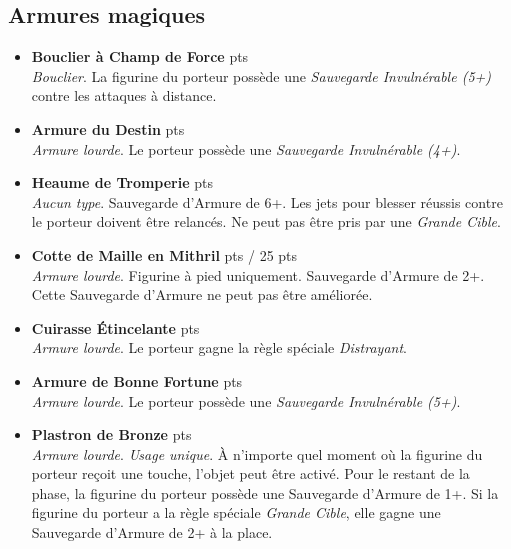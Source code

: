\newpage

\subsection{Armures magiques}

\begin{multicols}{2}
\begin{itemize}[label={-}]
\item \textbf{Bouclier à Champ de Force}  {pts} \\
\emph{Bouclier}. La figurine du porteur possède une \emph{Sauvegarde Invulnérable (5+)} contre les attaques à distance.

\item \textbf{Armure du Destin}  {pts} \\
\emph{Armure lourde}. Le porteur possède une \emph{Sauvegarde Invulnérable (4+)}.

\item \textbf{Heaume de Tromperie}  {pts} \\
\emph{Aucun type}. Sauvegarde d'Armure de 6+. Les jets pour blesser réussis contre le porteur doivent être relancés. Ne peut pas être pris par une \emph{Grande Cible}.

\item \textbf{Cotte de Maille en Mithril}  {pts} / 25 {pts} \\
\emph{Armure lourde}. Figurine à pied uniquement. Sauvegarde d'Armure de 2+. Cette Sauvegarde d'Armure ne peut pas être améliorée.

\item \textbf{Cuirasse Étincelante}  {pts} \\
\emph{Armure lourde}. Le porteur gagne la règle spéciale \emph{Distrayant}.

\item \textbf{Armure de Bonne Fortune}  {pts} \\
\emph{Armure lourde}. Le porteur possède une \emph{Sauvegarde Invulnérable (5+)}.

\item \textbf{Plastron de Bronze}  {pts} \\
\emph{Armure lourde}. \emph{Usage unique}. À n'importe quel moment où la figurine du porteur reçoit une touche, l'objet peut être activé. Pour le restant de la phase, la figurine du porteur possède une Sauvegarde d'Armure de 1+. Si la figurine du porteur a la règle spéciale \emph{Grande Cible}, elle gagne une Sauvegarde d'Armure de 2+ à la place.


\end{itemize}
\end{multicols}
